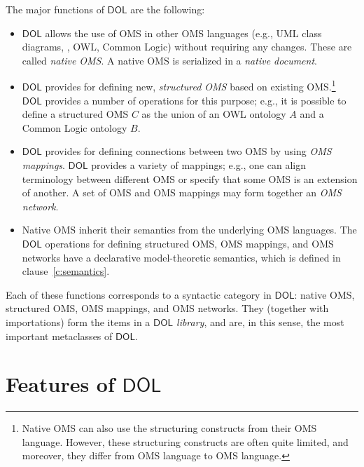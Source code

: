 \documentclass[10pt,fleqn,final]{scrreprt}
\newcommand{\cbs}[0]{\color{red}\xspace} %
\newcommand{\cbe}[0]{\color{black}\xspace} %
\newcommand*{\DOL}{\ensuremath{\mathsf{DOL}}\xspace}
\newcommand{\clauserefname}{clause}
\newcommand{\cref}[1]{\clauserefname~\ref{#1}}
\newenvironment{definitions}[0]{\medskip }{}
\begin{document}
\begin{definitions}
The major functions of \DOL are the following: 
\begin{itemize}
		\item \DOL allows the use of OMS in other OMS languages (e.g., UML class diagrams, \CASL, 
		OWL, Common Logic) without requiring any changes. These are called \emph{native OMS}. \cbs A native OMS is serialized in a \emph{native document}. \cbe  
		\item \DOL provides for defining new, \emph{structured OMS} based on existing OMS.\footnote{Native OMS can also use the structuring constructs from their OMS language. However, these structuring constructs are often quite limited, and moreover, they differ from OMS language to OMS language.} \DOL provides a number of operations for this purpose; e.g.,
		it is possible to define a structured OMS $C$ as the union of an OWL
		ontology $A$ and a Common Logic ontology $B$.
		\item \DOL provides for defining connections between two OMS by using 
		\emph{OMS mappings}. \DOL provides a variety of mappings; e.g.,  one can align terminology 
		between different OMS or specify that some OMS is an extension of another. A set of OMS
		and OMS mappings may form together an \emph{OMS network}.
		\item Native OMS inherit their semantics from the underlying OMS languages. The \DOL
		 operations for defining structured OMS, 
		OMS mappings, and OMS networks have a declarative model-theoretic semantics, which is 
		 defined in \cref{c:semantics}.  
\end{itemize}
 
\cbs Each of these functions corresponds to a syntactic category in \DOL: native OMS, structured
 OMS, OMS mappings, and OMS networks. They (together with importations) form the items in a
\emph{\DOL library}, and are, in this sense, the most important metaclasses of \DOL. 
\cbe

 





\section{Features of \DOL}\label{c:req:overview}


\end{definitions}
\end{document}
